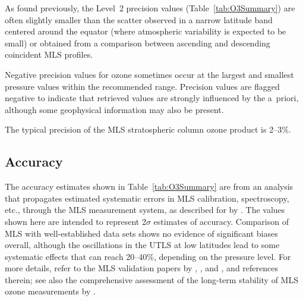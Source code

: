 As found previously, the Level~2 precision values (Table~\ref{tab:O3Summary}) are often slightly smaller than the scatter observed in a narrow latitude band centered around the equator (where atmospheric variability is expected to be small) or obtained from a comparison between ascending and descending coincident MLS profiles.

Negative precision values for ozone sometimes occur at the largest and smallest pressure values within the recommended range. Precision values are flagged negative to indicate that retrieved values are strongly influenced by the a~priori, although some geophysical information may also be present.

The typical precision of the MLS stratospheric column ozone product is 2--3\%.

\subsection{Accuracy}

The accuracy estimates shown in Table~\ref{tab:O3Summary} are from an analysis that propagates estimated systematic errors in MLS calibration, spectroscopy, etc., through the MLS measurement system, as described for \vii by \citet{ReadEtal:2007}. The values shown here are intended to represent 2$\sigma$ estimates of accuracy. Comparison of MLS  with well-established data sets shows no evidence of significant biases overall, although the oscillations in the UTLS at low latitudes lead to some systematic effects that can reach 20--40\%, depending on the pressure level. For more details, refer to the MLS validation papers by \citet{FroidevauxEtal:2008:O3}, \citet{JiangEtal:2007:MLSO3Valid}, and \citet{LiveseyEtal:2008}, and references therein; see also the comprehensive assessment of the long-term stability of MLS ozone measurements by \citet{HubertEtal:2016}. 

